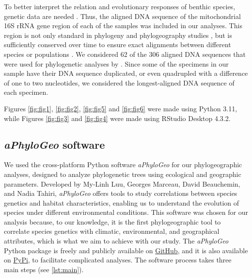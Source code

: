 To better interpret the relation and evolutionary responses of benthic species, genetic data are needed \citep{wilson_speciation_1987, uhlir_adding_2021}. Thus, the aligned DNA sequence of the mitochondrial 16S rRNA gene region of each of the samples was included in our analyses. This region is not only standard in phylogeny and phylogeography studies \citep{hugenholtz1998impact}, but is sufficiently conserved over time to ensure exact alignments between different species or populations \citep{saccone1999evolutionary}. We considered 62 of the 306 aligned DNA sequences that were used for phylogenetic analyses by \citep{uhlir_adding_2021}. Since some of the specimens in our sample have their DNA sequence duplicated, or even quadrupled with a difference of one to two nucleotides, we considered the longest-aligned DNA sequence of each specimen. 

Figures \ref{fig:fig1}, \ref{fig:fig2}, \ref{fig:fig5} and \ref{fig:fig6} were made using Python 3.11, while Figures \ref{fig:fig3} and \ref{fig:fig4} were made using RStudio Desktop 4.3.2.

\subsection{\textit{aPhyloGeo} software}\label{\textit{aPhyloGeo} software}

We used the cross-platform Python software \textit{aPhyloGeo} for our phylogeographic analyses, designed to analyze phylogenetic trees using ecological and geographic parameters. Developed by My-Linh Luu, Georges Marceau, David Beauchemin, and Nadia Tahiri, \textit{aPhyloGeo} offers tools to study correlations between species genetics and habitat characteristics, enabling us to understand the evolution of species under different environmental conditions. This software was chosen for our analysis because, to our knowledge, it is the first phylogeographic tool to correlate species genetics with climatic, environmental, and geographical attributes, which is what we aim to achieve with our study. The \textit{aPhyloGeo} Python package is freely and publicly available on \href{https://github.com/tahiri-lab/aPhyloGeo}{GitHub}, and it is also available on \href{https://pypi.org/project/aphylogeo/}{PyPi}, to facilitate complicated analyses. The software process takes three main steps (see \autoref{lst:main}).


